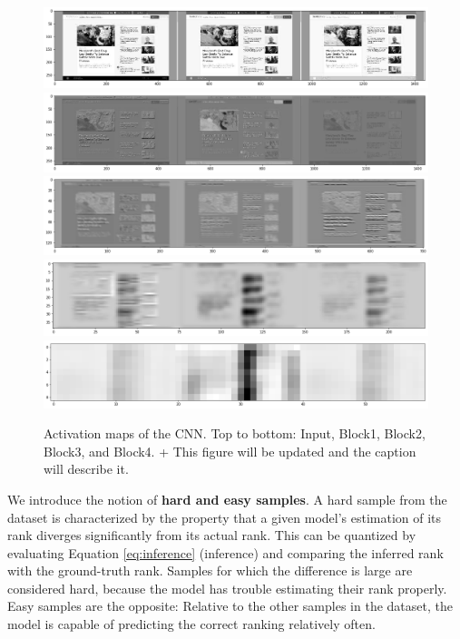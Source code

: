 \begin{figure}
    \centering
    \includegraphics[clip,width=\columnwidth]{resources/analysis/feat-map-0.png}\\
    \includegraphics[clip,width=\columnwidth]{resources/analysis/feat-map-1.png}\\
    \includegraphics[clip,width=\columnwidth]{resources/analysis/feat-map-2.png}\\
    \includegraphics[clip,width=\columnwidth]{resources/analysis/feat-map-3.png}\\
    \includegraphics[clip,width=\columnwidth]{resources/analysis/feat-map-4.png}\\
    \caption[Activation maps of the CNN]{Activation maps of the CNN. Top to bottom: Input, Block1, Block2, Block3, and Block4. + This figure will be updated and the caption will describe it.}
    \label{fig:activationmaps}
\end{figure}

We introduce the notion of \textbf{hard and easy samples}. A hard sample from the dataset is characterized by the property that a given model's estimation of its rank diverges significantly from its actual rank. This can be quantized by evaluating Equation \ref{eq:inference} (inference) and comparing the inferred rank with the ground-truth rank. Samples for which the difference is large are considered hard, because the model has trouble estimating their rank properly. Easy samples are the opposite: Relative to the other samples in the dataset, the model is capable of predicting the correct ranking relatively often.

